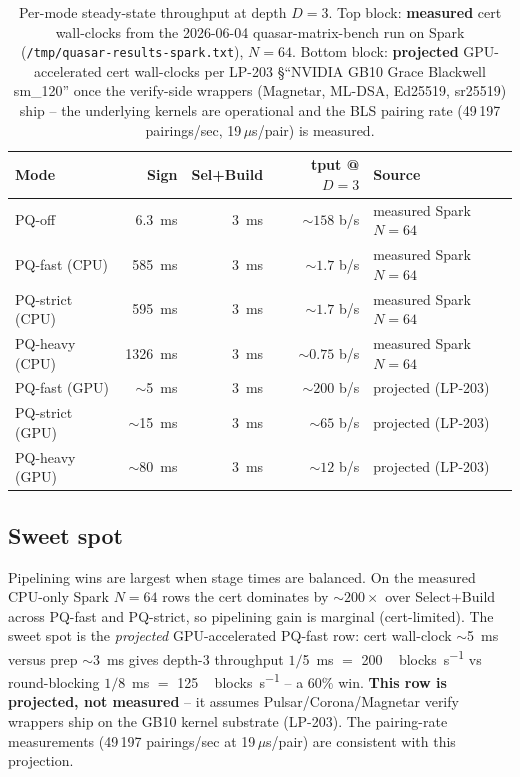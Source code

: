 \begin{table}[h]
\centering
\small
\begin{tabular}{@{}lrrrl@{}}
\toprule
\textbf{Mode} & \textbf{Sign} & \textbf{Sel+Build} & \textbf{tput @ $D{=}3$} & \textbf{Source} \\
\midrule
PQ-off & \SI{6.3}{\milli\second} & \SI{3}{\milli\second} & $\sim 158$ b/s & measured Spark $N{=}64$ \\
PQ-fast (CPU) & \SI{585}{\milli\second} & \SI{3}{\milli\second} & $\sim 1.7$ b/s & measured Spark $N{=}64$ \\
PQ-strict (CPU) & \SI{595}{\milli\second} & \SI{3}{\milli\second} & $\sim 1.7$ b/s & measured Spark $N{=}64$ \\
PQ-heavy (CPU) & \SI{1326}{\milli\second} & \SI{3}{\milli\second} & $\sim 0.75$ b/s & measured Spark $N{=}64$ \\
\addlinespace
PQ-fast (GPU) & $\sim$\SI{5}{\milli\second} & \SI{3}{\milli\second} & $\sim 200$ b/s & projected (LP-203) \\
PQ-strict (GPU) & $\sim$\SI{15}{\milli\second} & \SI{3}{\milli\second} & $\sim 65$ b/s & projected (LP-203) \\
PQ-heavy (GPU) & $\sim$\SI{80}{\milli\second} & \SI{3}{\milli\second} & $\sim 12$ b/s & projected (LP-203) \\
\bottomrule
\end{tabular}
\caption{Per-mode steady-state throughput at depth $D{=}3$.
Top block: \textbf{measured} cert wall-clocks from the 2026-06-04
quasar-matrix-bench run on Spark (\texttt{/tmp/quasar-results-spark.txt}),
$N{=}64$. Bottom block: \textbf{projected} GPU-accelerated cert
wall-clocks per LP-203 \S{}``NVIDIA GB10 Grace Blackwell sm\_120''
once the verify-side wrappers (Magnetar, ML-DSA, Ed25519, sr25519)
ship -- the underlying kernels are operational and the BLS pairing
rate (49\,197 pairings/sec, 19\,$\mu$s/pair) is measured.}
\label{tab:throughput}
\end{table}

\subsection{Sweet spot}

Pipelining wins are largest when stage times are balanced. On the
measured CPU-only Spark $N{=}64$ rows the cert dominates by
$\sim 200\times$ over Select+Build across PQ-fast and PQ-strict,
so pipelining gain is marginal (cert-limited). The sweet spot is
the \emph{projected} GPU-accelerated PQ-fast row: cert wall-clock
$\sim$\SI{5}{\milli\second} versus prep $\sim$\SI{3}{\milli\second}
gives depth-3 throughput $1/$\SI{5}{\milli\second} $=$
\SI{200}{\,blocks\per\second} vs round-blocking
$1/$\SI{8}{\milli\second} $=$ \SI{125}{\,blocks\per\second} -- a
$60\%$ win. \textbf{This row is projected, not measured} -- it
assumes Pulsar/Corona/Magnetar verify wrappers ship on the GB10
kernel substrate (LP-203). The pairing-rate measurements
(49\,197 pairings/sec at 19\,$\mu$s/pair) are consistent with
this projection.

